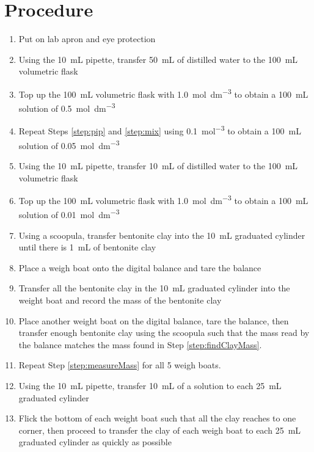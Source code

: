 \documentclass[11pt, letterpaper]{article}
\begin{document}
\section{Procedure}

\begin{enumerate}
    \item Put on lab apron and eye protection
    \item Using the \SI{10}{mL} pipette, transfer \SI{50}{mL} of distilled water to the \SI{100}{mL} volumetric flask \label{step:pip}
    \item Top up the \SI{100}{mL} volumetric flask with \SI{1.0}{mol.dm^{-3}}  to obtain a \SI{100}{mL} solution of \SI{0.5}{mol.dm^{-3}}  \label{step:mix}
    \item Repeat Steps \ref*{step:pip} and \ref*{step:mix} using \SI{0.1}{mol^{-3}}  to obtain a \SI{100}{mL} solution of \SI{0.05}{mol.dm^{-3}} 
    \item Using the \SI{10}{mL} pipette, transfer \SI{10}{mL} of distilled water to the \SI{100}{mL} volumetric flask
    \item Top up the \SI{100}{mL} volumetric flask with \SI{1.0}{mol.dm^{-3}}  to obtain a \SI{100}{mL} solution of \SI{0.01}{mol.dm^{-3}} 
    \item Using a scoopula, transfer bentonite clay into the \SI{10}{mL} graduated cylinder until there is \SI{1}{mL} of bentonite clay
    \item Place a weigh boat onto the digital balance and tare the balance
    \item Transfer all the bentonite clay in the \SI{10}{mL} graduated cylinder into the weight boat and record the mass of the bentonite clay \label{step:findClayMass}
    \item \label{step:measureMass} Place another weight boat on the digital balance, tare the balance, then transfer enough bentonite clay using the scoopula such that the mass read by the balance matches the mass found in Step \ref*{step:findClayMass}.
    \item Repeat Step \ref*{step:measureMass} for all 5 weigh boats.
    \item Using the \SI{10}{mL} pipette, transfer \SI{10}{mL} of a solution to each \SI{25}{mL} graduated cylinder
    \item Flick the bottom of each weight boat such that all the clay reaches to one corner, then proceed to transfer the clay of each weigh boat to each \SI{25}{mL} graduated cylinder as quickly as possible

\end{enumerate}
\end{document}
